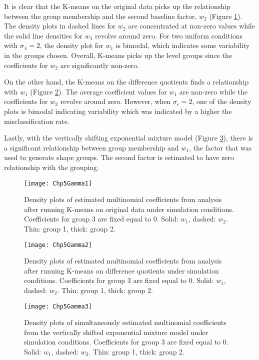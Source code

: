 It is clear that the K-means on the original data picks up the relationship between the group membership and the second baseline factor, $w_{2}$ (Figure \ref{fig:gamma1}). The density plots in dashed lines for $w_{2}$ are concentrated at non-zero values while the solid line densities for $w_{1}$ revolve around zero. For two uniform conditions with $\sigma_{\lambda}=2$, the density plot for $w_{1}$ is bimodal, which indicates some variability in the groups chosen. Overall, K-means picks up the level groups since the coefficients for $w_{2}$ are significantly non-zero.

On the other hand, the K-means on the difference quotients finds a relationship with $w_{1}$ (Figure \ref{fig:gamma2}). The average coefficient values for $w_{1}$ are non-zero while the coefficients for $w_{2}$ revolve around zero. However, when $\sigma_{\epsilon}=2$, one of the density plots is bimodal indicating variability which was indicated by a higher the misclassification rate.

Lastly, with the vertically shifting exponential mixture model (Figure \ref{fig:gamma3}), there is a significant relationship between group membership and $w_{1}$, the factor that was used to generate shape groups. The second factor is estimated to have zero relationship with the grouping.

\begin{landscape}
\begin{figure}[h]
\centering
\texttt{[image: Chp5Gamma1]}
\label{fig:gamma1}
\caption{Density plots of estimated multinomial coefficients from analysis after running K-means on original data under  simulation conditions. Coefficients for group 3 are fixed equal to 0. Solid: $w_{1}$, dashed: $w_{2}$. Thin: group 1, thick:  group 2.}
\end{figure}
\begin{figure}[h]
\centering
\texttt{[image: Chp5Gamma2]}
\label{fig:gamma2}
\caption{Density plots of estimated multinomial coefficients from analysis after running K-means on difference quotients under simulation conditions. Coefficients for group 3 are fixed equal to 0. Solid: $w_{1}$, dashed: $w_{2}$. Thin: group 1, thick:  group 2.}
\end{figure}
\begin{figure}[h]
\centering
\texttt{[image: Chp5Gamma3]}
\label{fig:gamma3}
\caption{Density plots of simultaneously estimated multinomial coefficients from the vertically shifted exponential mixture model under simulation conditions. Coefficients for group 3 are fixed equal to 0. Solid: $w_{1}$, dashed: $w_{2}$. Thin: group 1, thick:  group 2.}
\end{figure}
\end{landscape}

